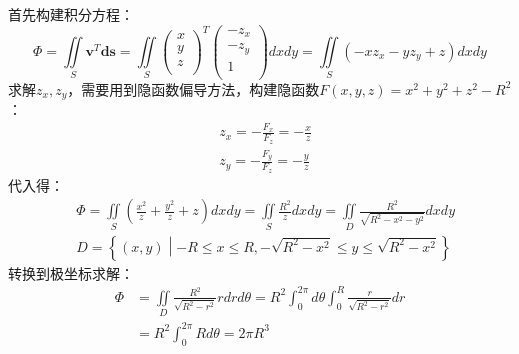 首先构建积分方程：
\[
\varPhi =\iint\limits_S{\boldsymbol{v}^T\boldsymbol{ds}}=\iint\limits_S{\left( \begin{array}{c}
	x\\
	y\\
	z\\
\end{array} \right) ^T\left( \begin{array}{c}
	-z_x\\
	-z_y\\
	1\\
\end{array} \right) dxdy}=\iint\limits_S{\left( -xz_x-yz_y+z \right) dxdy}
\]
求解$z_x,z_y$，需要用到隐函数偏导方法，构建隐函数$F\left( x,y,z \right) =x^2+y^2+z^2-R^2$：
\begin{align*}
&z_x=-\frac{F_x}{F_z}=-\frac{x}{z} \\
&z_y=-\frac{F_y}{F_z}=-\frac{y}{z}
\end{align*}
代入得：
\begin{align*}
&\varPhi =\iint\limits_S{\left( \frac{x^2}{z}+\frac{y^2}{z}+z \right) dxdy}=\iint\limits_S{\frac{R^2}{z}dxdy}=\iint\limits_D{\frac{R^2}{\sqrt{R^2-x^2-y^2}}dxdy} \\
&D=\left\{ \left( x,y \right) \middle| -R\leqslant x\leqslant R,-\sqrt{R^2-x^2}\leqslant y\leqslant \sqrt{R^2-x^2} \right\}
\end{align*}
转换到极坐标求解：
\begin{align*}
\varPhi &=\iint\limits_D{\frac{R^2}{\sqrt{R^2-r^2}}rdrd\theta}=R^2\int_0^{2\pi}{d\theta \int_0^R{\frac{r}{\sqrt{R^2-r^2}}dr}} \\
&=R^2\int_0^{2\pi}{Rd\theta}=2\pi R^3
\end{align*}




